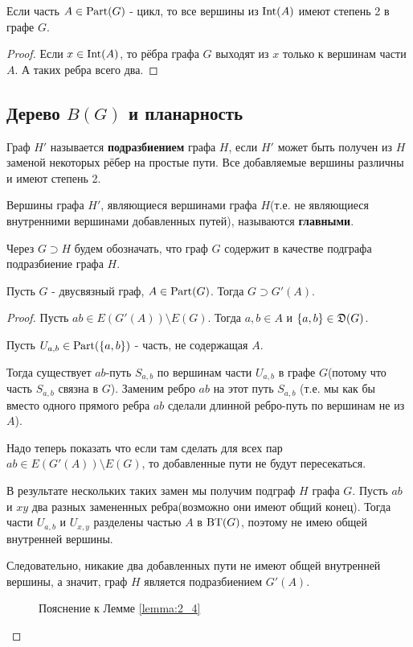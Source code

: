 \begin{crly}[Следствие 2.2] \label{corollary:2_2}
	Если часть $A \in \operatorname{Part}(G)$ - цикл, то все вершины из  $\operatorname{Int}(A)$ имеют степень 2 в графе $G$.
\end{crly}
\begin{proof}
	Если $x \in \operatorname{Int}(A)$, то рёбра графа $G$ выходят из $x$ только к вершинам части  $A$.
	А таких ребра всего два.
\end{proof}

\subsection{Дерево $B(G)$ и планарность}

\begin{df}[Подразбиение]
	Граф $H'$ называется \textbf{подразбиением} графа $H$, если  $H'$ может быть получен из  $H$ заменой некоторых рёбер на простые пути.
	Все добавляемые вершины различны и имеют степень 2. 

	Вершины графа $H'$, являющиеся вершинами графа  $H$(т.е. не являющиеся внутренними вершинами добавленных путей), называются \textbf{главными}.
\end{df}

\begin{prop}
	Через $G \supset H$ будем обозначать, что граф  $G$ содержит в качестве подграфа подразбиение графа  $H$.
\end{prop}

\begin{lm}[Лемма 2.4] \label{lemma:2_4}
	Пусть $G$ - двусвязный граф,  $A \in \operatorname{Part}(G)$.
	Тогда  $G \supset G'(A)$.
\end{lm}
\begin{proof}
	Пусть $ab \in E(G'(A)) \setminus E(G)$.
	Тогда  $a, b \in A$ и  $\{a, b\} \in \mathfrak{D}(G)$. 

	Пусть $U_{a, b} \in \operatorname{Part}(\{a, b\})$ - часть, не содержащая $A$.

	Тогда существует  $ab$-путь $S_{a, b}$ по вершинам части  $U_{a, b}$ в графе $G$(потому что часть $S_{a, b}$ связна в $G$).
	Заменим ребро  $ab$ на этот путь  $S_{a, b}$ (т.е. мы как бы вместо одного прямого ребра $ab$ сделали длинной ребро-путь по вершинам не из $A$).

	Надо теперь показать что если там сделать для всех пар $ab \in E(G'(A)) \setminus E(G)$, то добавленные пути не будут пересекаться.

	В результате нескольких таких замен мы получим подграф $H$ графа  $G$.
	Пусть $ab$ и  $xy$ два разных замененных ребра(возможно они имеют общий конец).
	Тогда части  $U_{a, b}$ и  $U_{x, y}$ разделены частью  $A$ в  $\operatorname{BT}(G)$, поэтому не имею общей внутренней вершины.

	Следовательно, никакие два добавленных пути не имеют общей внутренней вершины, а значит, граф $H$ является подразбиением  $G'(A)$.
	
\begin{figure}[ht]
    \centering
	\caption{Пояснение к Лемме \ref{lemma:2_4}}
    \label{fig:lemma_2_4}
\end{figure}

\end{proof}


